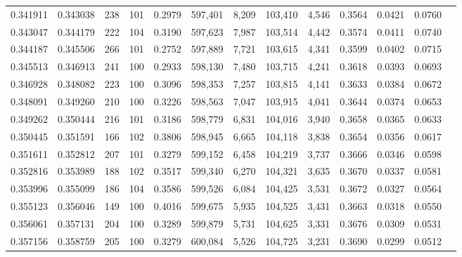 \begin{tabular}{rrrrrrrrrrrrr}
0.341911 & 0.343038 &   238 & 101 &                                     0.2979 & 597,401 &   8,209 & 103,410 &   4,546 & 0.3564 & 0.0421 & 0.0760 \\
0.343047 & 0.344179 &   222 & 104 &                                     0.3190 & 597,623 &   7,987 & 103,514 &   4,442 & 0.3574 & 0.0411 & 0.0740 \\
0.344187 & 0.345506 &   266 & 101 &                                     0.2752 & 597,889 &   7,721 & 103,615 &   4,341 & 0.3599 & 0.0402 & 0.0715 \\
0.345513 & 0.346913 &   241 & 100 &                                     0.2933 & 598,130 &   7,480 & 103,715 &   4,241 & 0.3618 & 0.0393 & 0.0693 \\
0.346928 & 0.348082 &   223 & 100 &                                     0.3096 & 598,353 &   7,257 & 103,815 &   4,141 & 0.3633 & 0.0384 & 0.0672 \\
0.348091 & 0.349260 &   210 & 100 &                                     0.3226 & 598,563 &   7,047 & 103,915 &   4,041 & 0.3644 & 0.0374 & 0.0653 \\
0.349262 & 0.350444 &   216 & 101 &                                     0.3186 & 598,779 &   6,831 & 104,016 &   3,940 & 0.3658 & 0.0365 & 0.0633 \\
0.350445 & 0.351591 &   166 & 102 &                                     0.3806 & 598,945 &   6,665 & 104,118 &   3,838 & 0.3654 & 0.0356 & 0.0617 \\
0.351611 & 0.352812 &   207 & 101 &                                     0.3279 & 599,152 &   6,458 & 104,219 &   3,737 & 0.3666 & 0.0346 & 0.0598 \\
0.352816 & 0.353989 &   188 & 102 &                                     0.3517 & 599,340 &   6,270 & 104,321 &   3,635 & 0.3670 & 0.0337 & 0.0581 \\
0.353996 & 0.355099 &   186 & 104 &                                     0.3586 & 599,526 &   6,084 & 104,425 &   3,531 & 0.3672 & 0.0327 & 0.0564 \\
0.355123 & 0.356046 &   149 & 100 &                                     0.4016 & 599,675 &   5,935 & 104,525 &   3,431 & 0.3663 & 0.0318 & 0.0550 \\
0.356061 & 0.357131 &   204 & 100 &                                     0.3289 & 599,879 &   5,731 & 104,625 &   3,331 & 0.3676 & 0.0309 & 0.0531 \\
0.357156 & 0.358759 &   205 & 100 &                                     0.3279 & 600,084 &   5,526 & 104,725 &   3,231 & 0.3690 & 0.0299 & 0.0512 \\

\end{tabular}
